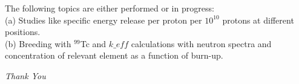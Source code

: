 \documentclass{beamer}
\begin{document}
    \begin{frame}
    The following topics are either performed or in progress:\\
    (a) Studies like specific energy release per proton per $10^{10}$ protons at different positions.    \\
    (b) Breeding with $^{99}$Tc and $k\_{eff}$ calculations with neutron spectra and concentration of relevant element as a function of burn-up.
    
    \vskip 1cm
    
    \begin{center}
             \LARGE \textsl {Thank You}
    \end{center}
    \end{frame}
\end{document}
